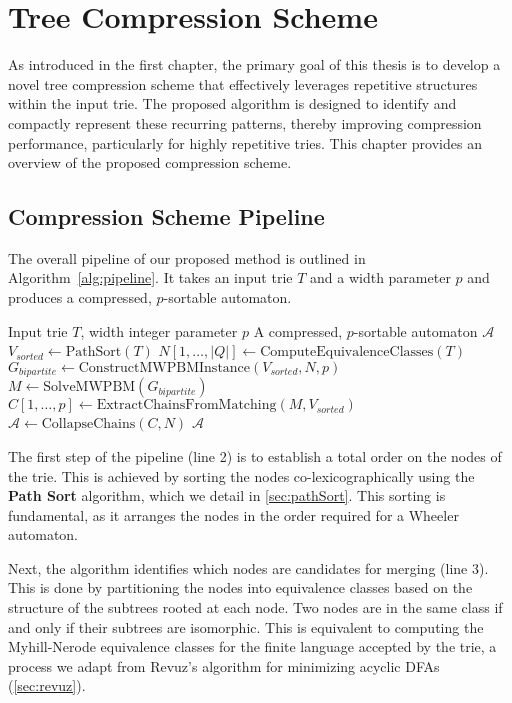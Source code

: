 \chapter{Tree Compression Scheme} \label{chp:project_overview}
As introduced in the first chapter, the primary goal of this thesis is to develop a novel tree compression scheme that effectively leverages repetitive structures within the input trie. The proposed algorithm is designed to identify and compactly represent these recurring patterns, thereby improving compression performance, particularly for highly repetitive tries. This chapter provides an overview of the proposed compression scheme.

\section{Compression Scheme Pipeline}
The overall pipeline of our proposed method is outlined in Algorithm~\ref{alg:pipeline}. It takes an input trie $T$ and a width parameter $p$ and produces a compressed, $p$-sortable automaton.
\begin{algorithm}[H]
\caption{$CompressTrie(T,p)$}
\label{alg:pipeline}
\begin{algorithmic}[1]
\Require Input trie $T$, width integer parameter $p$
\Ensure A compressed, $p$-sortable automaton $\mathcal{A}$
    \State $V_{sorted} \gets \text{PathSort}(T)$ 
    \State $N[1,\dots,|Q|] \gets \text{ComputeEquivalenceClasses}(T)$
    \State $G_{bipartite} \gets \text{ConstructMWPBMInstance}(V_{sorted}, N, p)$
    \State $M \gets \text{SolveMWPBM}(G_{bipartite})$ 
    \State $C[1,\dots,p] \gets \text{ExtractChainsFromMatching}(M, V_{sorted})$ 
    \State $\mathcal{A} \gets \text{CollapseChains}(C, N)$ 
    \State \Return $\mathcal{A}$
\end{algorithmic}
\end{algorithm}

The first step of the pipeline (line 2) is to establish a total order on the nodes of the trie. This is achieved by sorting the nodes co-lexicographically using the \textbf{Path Sort} algorithm, which we detail in \cref{sec:pathSort}. This sorting is fundamental, as it arranges the nodes in the order required for a Wheeler automaton.

Next, the algorithm identifies which nodes are candidates for merging (line 3). This is done by partitioning the nodes into equivalence classes based on the structure of the subtrees rooted at each node. Two nodes are in the same class if and only if their subtrees are isomorphic. This is equivalent to computing the Myhill-Nerode equivalence classes for the finite language accepted by the trie, a process we adapt from Revuz's algorithm for minimizing acyclic DFAs (\cref{sec:revuz}).

